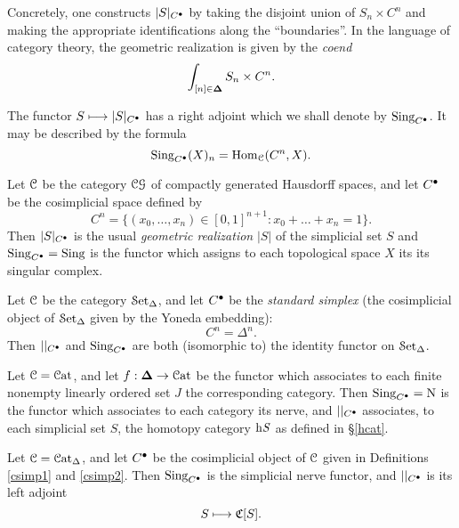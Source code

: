 \begin{remark}
Concretely, one constructs $|S|_{C^{\bullet}}$ by taking the
disjoint union of $S_n \times C^n$ and making the appropriate
identifications along the ``boundaries''. In the language of category theory, the geometric realization is given by
the {\it coend} $$\int_{[n] \in \operatorname{{\bf \Delta}}} S_n \times C^{n}.$$
\end{remark}

The functor $S \longmapsto |S|_{C^{\bullet}}$ has a right adjoint
which we shall denote by $\operatorname{Sing}_{C^{\bullet}}$. It may be described
by the formula
$$ \operatorname{Sing}_{C^{\bullet}}(X)_n = \operatorname{Hom}_{\operatorname{\mathcal{C}}}( C^n, X).$$

\begin{example}
Let $\operatorname{\mathcal{C}}$ be the category $\operatorname{\mathcal{C}\mathcal{G}}$ of compactly generated Hausdorff
spaces, and let $C^{\bullet}$ be the cosimplicial space defined by
$$ C^n = \{ ( x_0, \ldots, x_n) \in [0,1]^{n+1} : x_0 + \ldots +
x_n = 1 \}.$$ Then $|S|_{C^{\bullet}}$ is the usual {\it geometric
realization} $|S|$ of the simplicial set $S$ and
$\operatorname{Sing}_{C^{\bullet}} = \operatorname{Sing}$ is the functor which assigns to each topological space $X$ its its singular complex.
\end{example}

\begin{example}
Let $\operatorname{\mathcal{C}}$ be the category $\operatorname{\mathcal{S}et_{\Delta}}$, and let $C^{\bullet}$ be the {\it standard simplex} (the cosimplicial object of $\operatorname{\mathcal{S}et_{\Delta}}$ given by the Yoneda embedding):
$$ C^n = \Delta^n.$$ Then $||_{C^{\bullet}}$ and $\operatorname{Sing}_{C^{\bullet}}$ are
both (isomorphic to) the identity functor on $\operatorname{\mathcal{S}et_{\Delta}}$.
\end{example}

\begin{example}
Let $\operatorname{\mathcal{C}} = \operatorname{\mathcal{C}at}$, and let $f: \operatorname{{\bf \Delta}} \rightarrow \operatorname{\mathcal{C}at}$ be the functor which associates
to each finite nonempty linearly ordered set $J$ the corresponding category.
Then $\operatorname{Sing}_{C^{\bullet}}= \operatorname{N}$ is the functor which associates to each category its nerve, and $||_{C^{\bullet}}$ associates, to each simplicial set $S$, the homotopy category $\rm{h} \it{S}$ as defined in \S \ref{hcat}.
\end{example}

\begin{example}
Let $\operatorname{\mathcal{C}} = \operatorname{\mathcal{C}at_{\Delta}}$, and let $C^{\bullet}$ be the cosimplicial
object of $\operatorname{\mathcal{C}}$ given in Definitions \ref{csimp1} and
\ref{csimp2}. Then 
$\operatorname{Sing}_{C^{\bullet}}$ is the simplicial nerve functor, and
$||_{C^{\bullet}}$ is its left adjoint
$$ S \longmapsto \operatorname{\mathfrak{C}}[S]. $$
\end{example}

